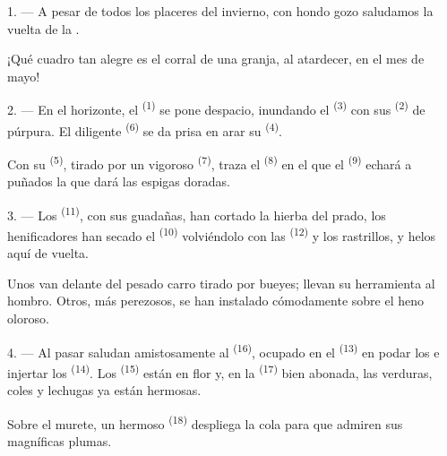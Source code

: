\VUsaut{3.0mm}
\VUsaut{3.0mm}

\VUsaut{4.0mm}

1. --- A pesar de todos los placeres del invierno, con hondo gozo
saludamos la vuelta de la .

¡Qué cuadro tan alegre es el corral de una granja, al atardecer, en el
mes de mayo!

2. --- En el horizonte, el  \textsuperscript{(1)} se pone despacio,
inundando el  \textsuperscript{(3)} con sus 
\textsuperscript{(2)} de púrpura. El diligente  \textsuperscript{(6)} se da
prisa en arar su  \textsuperscript{(4)}.

Con su  \textsuperscript{(5)}, tirado por un vigoroso 
\textsuperscript{(7)}, traza el  \textsuperscript{(8)} en el que el
 \textsuperscript{(9)} echará a puñados la  que dará
las espigas doradas.

3. --- Los  \textsuperscript{(11)}, con sus guadañas, han cortado la
hierba del prado, los henificadores han secado el 
\textsuperscript{(10)} volviéndolo con las  \textsuperscript{(12)} y los
rastrillos, y helos aquí de vuelta.

Unos van delante del pesado carro tirado por bueyes; llevan su herramienta
al hombro. Otros, más perezosos, se han instalado cómodamente sobre el
heno oloroso.

4. --- Al pasar saludan amistosamente al  \textsuperscript{(16)},
ocupado en el  \textsuperscript{(13)} en podar los
 e injertar los  \textsuperscript{(14)}. Los
 \textsuperscript{(15)} están en flor y, en la 
\textsuperscript{(17)} bien abonada, las verduras, coles y lechugas ya están
hermosas.

Sobre el murete, un hermoso  \textsuperscript{(18)} despliega la
cola para que admiren sus magníficas plumas.

\VUsaut{3.0mm}

